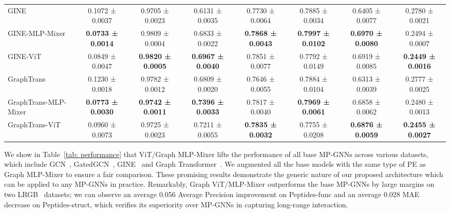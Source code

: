 \documentclass{article}
\begin{document}
\begin{table*}[t]
\begin{tabular}{lccccccc}
    GINE 
    & 0.1072 ± 0.0037 & 0.9705 ± 0.0023 & 0.6131 ± 0.0035 & 0.7730 ± 0.0064 & 0.7885 ± 0.0034 & 0.6405 ± 0.0077 & 0.2780 ± 0.0021 \\
    
  
    {GINE-MLP-Mixer}
    & {\bf {0.0733 ± 0.0014}} & {{0.9809 ± 0.0004}}          & {{0.6833 ± 0.0022}}           & {\bf{0.7868 ± 0.0043}}          & {\bf{0.7997 ± 0.0102}}           & {\bf{0.6970 ± 0.0080}}          & {{0.2494 ± 0.0007}}           \\

    {GINE-ViT} 
    & {0.0849 ± 0.0047}    & \bf{0.9820 ± 0.0005}    & \bf{0.6967 ± 0.0040}    & {0.7851 ± 0.0077}    & {0.7792 ± 0.0149}    & {0.6919 ± 0.0085}    & \bf{0.2449 ± 0.0016}    \\
    \midrule
    
    GraphTrans
    & 0.1230 ± 0.0018
    & 0.9782 ± 0.0012
    & 0.6809 ± 0.0020
    & 0.7646 ± 0.0055
    & 0.7884 ± 0.0104
    & 0.6313 ± 0.0039
    & 0.2777 ± 0.0025
    \\


    GraphTrans-MLP-Mixer
    & {\bf {0.0773 ± 0.0030}} & {\bf {0.9742 ± 0.0011}}          & {\bf {0.7396 ± 0.0033}}           & {{0.7817 ± 0.0040}}          & {\bf{0.7969 ± 0.0061}}           & {{0.6858 ± 0.0062}}          & {{0.2480 ± 0.0013}}           \\
    
    {GraphTrans-ViT} 
    & {0.0960 ± 0.0073}    & {0.9725 ± 0.0023}    & {0.7211 ± 0.0055}    & \bf{0.7835 ± 0.0032}    & {0.7755 ± 0.0208}    & \bf{0.6876 ± 0.0059}    & \bf{0.2455 ± 0.0027}    \\
    \bottomrule
    \end{tabular}
\end{table*}


We show in Table~\ref{tab: performance} that ViT/Graph MLP-Mixer lifts the performance of all base MP-GNNs across various datasets, which include GCN~\citep{kipf2017semi}, GatedGCN~\citep{bresson2017gatedgcn}, GINE~\citep{hu2019gine} and Graph Transformer~\citep{dwivedi2021generalization}. We augmented all the base models with the same type of PE as Graph MLP-Mixer to ensure a fair comparison. These promising results demonstrate the generic nature of our proposed architecture which can be applied to any MP-GNNs in practice. 
Remarkably, Graph ViT/MLP-Mixer outperforms the base MP-GNNs by large margins on two LRGB~\citep{dwivedi2022long} datasets; we can observe an average 0.056 Average Precision improvement on Peptides-func and an average 0.028 MAE decrease on Peptides-struct, which verifies its superiority over MP-GNNs in capturing long-range interaction.
\end{document}
